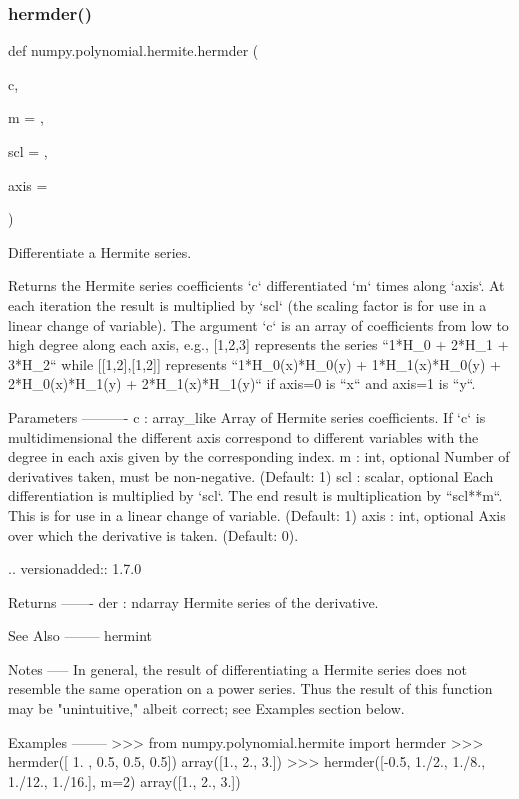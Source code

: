 \subsubsection{\texorpdfstring{hermder()}{hermder()}}
{\footnotesize\ttfamily def numpy.\+polynomial.\+hermite.\+hermder (\begin{DoxyParamCaption}\item[{}]{c,  }\item[{}]{m = {},  }\item[{}]{scl = {},  }\item[{}]{axis = {} }\end{DoxyParamCaption})}

\begin{DoxyVerb}Differentiate a Hermite series.

Returns the Hermite series coefficients `c` differentiated `m` times
along `axis`.  At each iteration the result is multiplied by `scl` (the
scaling factor is for use in a linear change of variable). The argument
`c` is an array of coefficients from low to high degree along each
axis, e.g., [1,2,3] represents the series ``1*H_0 + 2*H_1 + 3*H_2``
while [[1,2],[1,2]] represents ``1*H_0(x)*H_0(y) + 1*H_1(x)*H_0(y) +
2*H_0(x)*H_1(y) + 2*H_1(x)*H_1(y)`` if axis=0 is ``x`` and axis=1 is
``y``.

Parameters
----------
c : array_like
    Array of Hermite series coefficients. If `c` is multidimensional the
    different axis correspond to different variables with the degree in
    each axis given by the corresponding index.
m : int, optional
    Number of derivatives taken, must be non-negative. (Default: 1)
scl : scalar, optional
    Each differentiation is multiplied by `scl`.  The end result is
    multiplication by ``scl**m``.  This is for use in a linear change of
    variable. (Default: 1)
axis : int, optional
    Axis over which the derivative is taken. (Default: 0).

    .. versionadded:: 1.7.0

Returns
-------
der : ndarray
    Hermite series of the derivative.

See Also
--------
hermint

Notes
-----
In general, the result of differentiating a Hermite series does not
resemble the same operation on a power series. Thus the result of this
function may be "unintuitive," albeit correct; see Examples section
below.

Examples
--------
>>> from numpy.polynomial.hermite import hermder
>>> hermder([ 1. ,  0.5,  0.5,  0.5])
array([1., 2., 3.])
>>> hermder([-0.5,  1./2.,  1./8.,  1./12.,  1./16.], m=2)
array([1., 2., 3.])\end{DoxyVerb}
 \mbox{\label{namespacenumpy_1_1polynomial_1_1hermite_a0ceadea040b69882c2a783b21adc4b4d}} 
